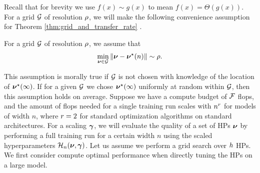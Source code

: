 Recall that for brevity we use $f(x) \sim g(x)$ to mean $f(x) = \Theta(g(x))$. For a grid $\mathcal{G}$ of resolution $\rho$, we will make the following convenience assumption for Theorem \ref{thm:grid_and_transfer_rate} .
\begin{assumption}\label{assump:grid_proximity}
For a grid $\mathcal{G}$ of resolution $\rho$, we assume that
\[
    \min_{\bm{\nu} \in \mathcal{G}} \norm{\bm{\nu} - \bm{\nu}^\star(n)} \sim \rho.
\]
\end{assumption}
This assumption is morally true if $\mathcal{G}$ is not chosen with knowledge of the location of $\bm{\nu}^\star(\infty)$. If for a given $\mathcal{G}$ we chose $\bm{\nu}^\star(\infty)$ uniformly at random within $\mathcal{G}$, then this assumption holds on average. 
Suppose we have a compute budget of $\mathcal{F}$ flops, and the amount of flops needed for a single training run scales with $n^{r}$ for models of width $n$, where $r = 2$ for standard optimization algorithms on standard architectures. For a scaling $\bm{\gamma}$, we will evaluate the quality of a set of HPs $\bm{\nu}$ by performing a full training run for a certain width $n$ using the scaled hyperparameters $\mathcal{H}_n(\bm{\nu}, \bm{\gamma})$. Let us assume we perform a grid search over $h$ HPs. We first consider compute optimal performance when directly tuning the HPs on a large model. 

